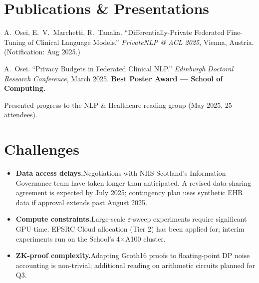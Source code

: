 \documentclass[11pt, a4paper]{article}
\begin{document}
\section{Publications \& Presentations}

\begin{description}[leftmargin=0pt, labelindent=0pt, itemsep=3pt, topsep=2pt]
  \item[\textcolor{accent}{Workshop paper (under review)}]
        A.~Osei, E.~V.~Marchetti, R.~Tanaka.
        ``Differentially-Private Federated Fine-Tuning of Clinical Language Models.''
        \textit{PrivateNLP @ ACL 2025}, Vienna, Austria. (Notification: Aug 2025.)

  \item[\textcolor{accent}{Poster}]
        A.~Osei. ``Privacy Budgets in Federated Clinical NLP.''
        \textit{Edinburgh Doctoral Research Conference}, March 2025.
        \textbf{Best Poster Award — School of Computing.}

  \item[\textcolor{accent}{Internal seminar}]
        Presented progress to the NLP \& Healthcare reading group (May 2025, 25 attendees).
\end{description}

\section{Challenges}

\begin{itemize}[leftmargin=*, itemsep=1pt, topsep=2pt]
  \item \textbf{Data access delays.}\enspace Negotiations with NHS Scotland's Information
        Governance team have taken longer than anticipated. A revised data-sharing agreement
        is expected by July 2025; contingency plan uses synthetic EHR data if approval extends
        past August 2025.

  \item \textbf{Compute constraints.}\enspace Large-scale $\varepsilon$-sweep experiments
        require significant GPU time. EPSRC Cloud allocation (Tier 2) has been applied for;
        interim experiments run on the School's 4×A100 cluster.

  \item \textbf{ZK-proof complexity.}\enspace Adapting Groth16 proofs to floating-point
        DP noise accounting is non-trivial; additional reading on arithmetic circuits
        planned for Q3.
\end{itemize}
\end{document}
